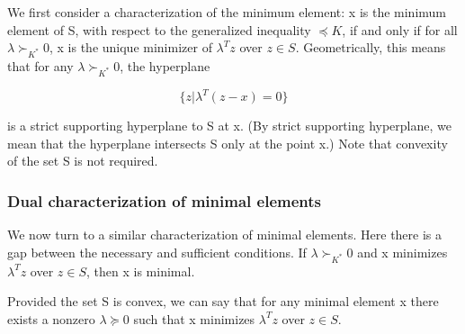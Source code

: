 \documentclass{article}
\begin{document}
We first consider a characterization of the minimum element: x is the minimum
element of S, with respect to the generalized inequality $\preceq K$, if and only if for all
$\lambda \succ_{K^*} 0$, x is the unique minimizer of $\lambda^T z$ over $z \in S$. Geometrically, this means
that for any $\lambda \succ_{K^*} 0$, the hyperplane

\[
    \{z|\lambda^T(z-x)=0\}
\]

is a strict supporting hyperplane to S at x. (By strict supporting hyperplane, we
mean that the hyperplane intersects S only at the point x.) Note that convexity
of the set S is not required.

\subsubsection*{Dual characterization of minimal elements}

We now turn to a similar characterization of minimal elements. Here there is a gap
between the necessary and sufficient conditions. If $\lambda \succ_{K^*} 0$ and x minimizes $\lambda^T z$
over $z \in S$, then x is minimal.

Provided the set S is convex, we can say that for any minimal element x there
exists a nonzero $\lambda \succeq 0$ such that x minimizes $\lambda^T z$ over $z \in S$.

\subsection*{}
\end{document}
